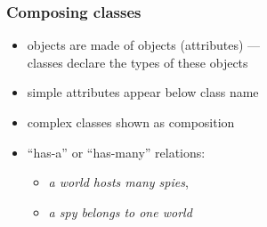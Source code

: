 \documentclass[UTF8]{beamer}
\begin{document}
\begin{frame}
    \frametitle{Composing classes}

  \begin{center}
  \end{center}

    \begin{itemize}
    \item objects are made of objects (\alert{attributes}) ---\\
      classes declare the types of these objects
    \item simple attributes appear below class name
    \item complex classes shown as \alert{composition}
    \item ``has-a'' or ``has-many'' relations:
      \begin{itemize}
        \item \emph{a world hosts many spies},
        \item \emph{a spy belongs to one world}
      \end{itemize}
    \end{itemize}

\end{frame}
\end{document}
